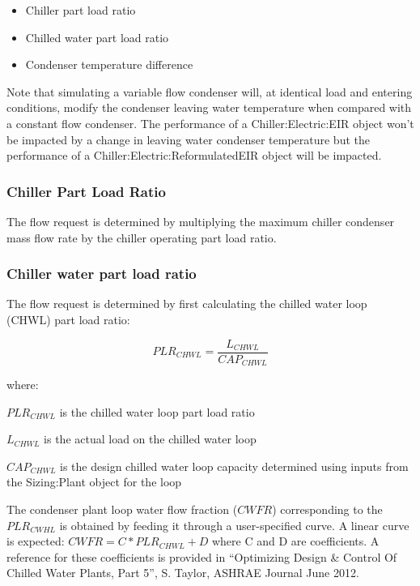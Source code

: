 \begin{itemize}
  \item Chiller part load ratio
  \item Chilled water part load ratio
  \item Condenser temperature difference
\end{itemize}

Note that simulating a variable flow condenser will, at identical load and entering conditions, modify the condenser leaving water temperature when compared with a constant flow condenser. The performance of a Chiller:Electric:EIR object won't be impacted by a change in leaving water condenser temperature but the performance of a Chiller:Electric:ReformulatedEIR object will be impacted.

\subsubsection{Chiller Part Load Ratio}

The flow request is determined by multiplying the maximum chiller condenser mass flow rate by the chiller operating part load ratio.

\subsubsection{Chiller water part load ratio}

The flow request is determined by first calculating the chilled water loop (CHWL) part load ratio:

\begin{equation}
{PLR_{CHWL}} = \frac{{L_{CHWL}}}{CAP_{CHWL}}
\end{equation}

where:

\({PLR_{CHWL}}\) is the chilled water loop part load ratio

\({L_{CHWL}}\) is the actual load on the chilled water loop

\({CAP_{CHWL}}\) is the design chilled water loop capacity determined using inputs from the Sizing:Plant object for the loop


The condenser plant loop water flow fraction (\({CWFR}\)) corresponding to the \({PLR_{CWHL}}\) is obtained by feeding it through a user-specified curve. A linear curve is expected: \(CWFR = C * {PLR_{CHWL}} + D\)  where C and D are coefficients. A reference for these coefficients is provided in ``Optimizing Design & Control Of Chilled Water Plants, Part 5'', S. Taylor, ASHRAE Journal June 2012.

